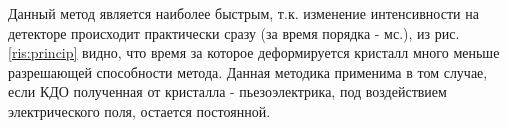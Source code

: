 Данный метод является наиболее быстрым, т.к. изменение интенсивности на детекторе происходит практически сразу (за время порядка - мс.),
из рис. \ref{ris:princip}  видно, что время за которое деформируется кристалл много меньше разрешающей способности метода.
Данная методика применима в том случае, если КДО полученная от кристалла - пьезоэлектрика, под воздействием электрического поля,
остается постоянной.


